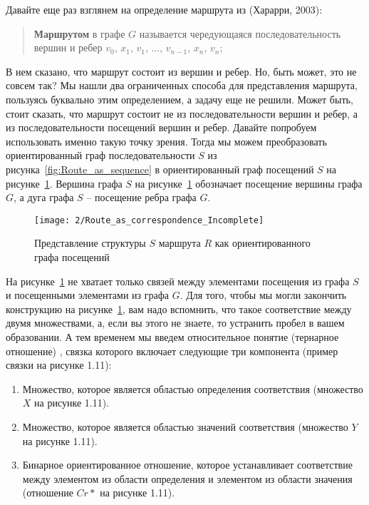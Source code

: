 Давайте еще раз взглянем на определение маршрута из (Харарри, 2003):

\begin{quotation}
  \textbf{Маршрутом} в графе $G$ называется чередующаяся
  последовательность вершин и ребер $v_0$, $x_1$, $v_1$, $\dotsc$, $v_{n-1}$,
  $x_n$, $v_n$;
\end{quotation}

В нем сказано, что маршрут состоит из вершин и ребер. Но, быть может,
это не совсем так? Мы нашли два ограниченных способа для представления
маршрута, пользуясь буквально этим определением, а задачу еще не
решили. Может быть, стоит сказать, что маршрут состоит не из
последовательности вершин и ребер, а из последовательности посещений
вершин и ребер. Давайте попробуем использовать именно такую точку
зрения. Тогда мы можем преобразовать ориентированный граф
последовательности $S$ из рисунка~\ref{fig:Route_as_sequence} в
ориентированный граф посещений $S$ на
рисунке~\ref{fig:Route_as_correspondence_Incomplete}. Вершина графа
$S$ на рисунке~\ref{fig:Route_as_correspondence_Incomplete} обозначает
посещение вершины графа $G$, а дуга графа $S$ – посещение ребра графа
$G$.

\begin{figure}
  \centering
  \texttt{[image: 2/Route\_as\_correspondence\_Incomplete]}
  \caption{Представление структуры $S$ маршрута $R$ как ориентированного графа посещений}
  \label{fig:Route_as_correspondence_Incomplete}
\end{figure}

На рисунке~\ref{fig:Route_as_correspondence_Incomplete} не хватает
только связей между элементами посещения из графа $S$ и посещенными
элементами из графа $G$. Для того, чтобы мы могли закончить
конструкцию на рисунке~\ref{fig:Route_as_correspondence_Incomplete},
вам надо вспомнить, что такое соответствие между двумя множествами, а,
если вы этого не знаете, то устранить пробел в вашем образовании. А
тем временем мы введем относительное понятие (тернарное отношение)
, связка которого включает следующие три
компонента (пример связки на рисунке 1.11):

\begin{enumerate}
\item Множество, которое является областью определения соответствия
  (множество $X$ на рисунке 1.11).
\item Множество, которое является областью значений соответствия
  (множество $Y$ на рисунке 1.11).
\item Бинарное ориентированное отношение, которое устанавливает
  соответствие между элементом из области определения и элементом из
  области значения (отношение $Cr*$ на рисунке 1.11).
\end{enumerate}

